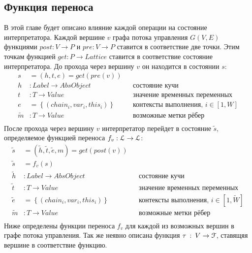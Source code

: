 \subsection{Функция переноса}%
\label{sec:trans_func}
В этой главе будет описано влияние каждой операции на состояние
интерпретатора.
Каждой вершине $v$ графа потока управления $G(V,E)$ функциями $post :
V \rightarrow P$ и $pre : V \rightarrow P$ ставится в соответствие две точки.
Этим точкам функцией $get : P \rightarrow Lattice$ ставится в
соответствие состояние интерпретатора. До прохода через вершину $v$ он
находится в состоянии $s$:
\begin{align*}
  s &= \left(h, t, e \right) = get\left( pre\left( v \right) \right) \\
  h &: Label \rightarrow AbsObject && \mbox{состояние кучи}\\
  t &: T \rightarrow Value && \mbox{значение временных переменных}\\
  e &= \left\{ \left( chain_i, var_i, this_i \right) \right\} &&
  \mbox{контексты выполнения, } i \in [1, W]\\
  \tilde{m} &: T \rightarrow Value && \mbox{возможные метки рёбер}\\
\end{align*}
После прохода через вершину $v$ интерпретатор перейдет в состояние
$\tilde{s}$, определяемое функцией переноса $f_v :
\EuScript{L} \rightarrow \EuScript{L}$:
\begin{align*}
  \tilde{s} &= (\tilde{h}, \tilde{t}, \tilde{e}, m) = get\left( post\left( v \right) \right) \\
  \tilde{s} &= f_v\left( s \right) \\
  \tilde{h} &: Label \rightarrow AbsObject && \mbox{состояние кучи}\\
  \tilde{t} &: T \rightarrow Value && \mbox{значение временных переменных}\\
  \tilde{e} &= \left\{ \left( chain_i, var_i, this_i \right) \right\}
  && \mbox{контексты выполнения, } i \in [1,\tilde{W}]\\
  \tilde{m} &: T \rightarrow Value && \mbox{возможные метки рёбер}\\
\end{align*}
Ниже определены функции переноса $f_v$ для каждой из возможных вершин
в графе потока управления. Так же неявно описана функция $\tau \: : \:
V \rightarrow \EuScript{F}$, ставящяя вершине в соответствие функцию.
